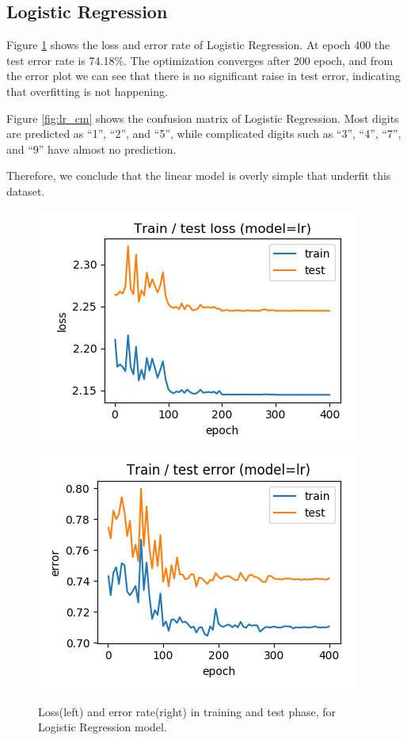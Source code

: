 \documentclass[journal]{IEEEtran}
\begin{document}
\subsection{Logistic Regression}

Figure \ref{fig:lr_loss} shows the loss and error rate of Logistic Regression. At epoch 400 the test error rate is 74.18\%. The optimization converges after 200 epoch, and from the error plot we can see that there is no significant raise in test error, indicating that overfitting is not happening.

Figure \ref{fig:lr_cm} shows the confusion matrix of Logistic Regression.
Most digits are predicted as ``1'', ``2'', and ``5'', while complicated digits such as
``3'', ``4'', ``7'', and ``9'' have almost no prediction.

Therefore, we conclude that the linear model is overly simple that underfit this dataset.

\begin{figure}[htb]
  \includegraphics[width=\linewidth]{images/lr-loss.png}
\endminipage\hfill
{}
  \includegraphics[width=\linewidth]{images/lr-error.png}
\endminipage
\caption{Loss(left) and error rate(right) in training and test phase, for Logistic Regression model.}\label{fig:lr_loss}
\end{figure}
\end{document}
